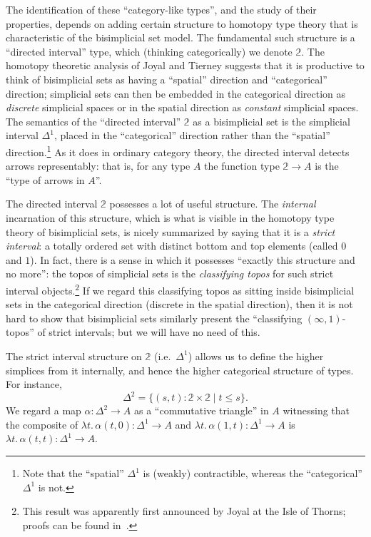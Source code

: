 \documentclass[12pt]{amsart}
\theoremstyle{plain}
\theoremstyle{definition}
\theoremstyle{remark}
\numberwithin{equation}{section}
\newcommand{\lam}[1]{\lambda #1.\,}
\newcommand{\two}{\mathbb{2}}
\begin{document}
The identification of these ``category-like types'', and the study of their properties, depends on adding certain structure to homotopy type theory that is characteristic of the bisimplicial set model.
The fundamental such structure is a ``directed interval'' type, which (thinking categorically) we denote $\two$.
The homotopy theoretic analysis of Joyal and Tierney \cite{JT} suggests that it is productive to think of bisimplicial sets as having a  ``spatial'' direction and ``categorical'' direction; simplicial sets can then be embedded in the categorical direction as \emph{discrete} simplicial spaces or in the spatial direction as \emph{constant} simplicial spaces. The semantics of the ``directed interval'' $\two$ as a bisimplicial set is the simplicial interval $\Delta^1$, placed in the ``categorical'' direction rather than the ``spatial'' direction.\footnote{Note that the ``spatial'' $\Delta^1$ is (weakly) contractible, whereas the ``categorical'' $\Delta^1$ is not.}
As it does in ordinary category theory, the directed interval detects arrows representably: that is, for any type $A$ the function type $\two\to A$ is the ``type of arrows in $A$''.

The directed interval $\two$ possesses a lot of useful structure.
The \emph{internal} incarnation of this structure, which is what is visible in the homotopy type theory of bisimplicial sets, is nicely summarized by saying that it is a \emph{strict interval}: a totally ordered set with distinct bottom and top elements (called $0$ and $1$).
In fact, there is a sense in which it possesses ``exactly this structure and no more'': the topos of simplicial sets is the \emph{classifying topos} for such strict interval objects.\footnote{This result was apparently first announced by Joyal at the Isle of Thorns; proofs can be found in~\cite{top-topos,maclane-moerdijk}.}
If we regard this classifying topos as sitting inside bisimplicial sets in the categorical direction (discrete in the spatial direction), then it is not hard to show that bisimplicial sets similarly present the ``classifying $(\infty,1)$-topos'' of strict intervals; but we will have no need of this.

The strict interval structure on $\two$ (i.e.\ $\Delta^1$) allows us to define the higher simplices from it internally, and hence the higher categorical structure of types.
For instance, \[\Delta^2 = \{ (s,t) : \two\times \two \mid t\le s \}.\] We regard a map $\alpha:\Delta^2\to A$ as a ``commutative triangle'' in $A$ witnessing that the composite of $\lam{t}\alpha(t,0):\Delta^1\to A$ and $\lam{t}\alpha(1,t):\Delta^1\to A$ is $\lam{t}\alpha(t,t):\Delta^1 \to A$.
\end{document}
